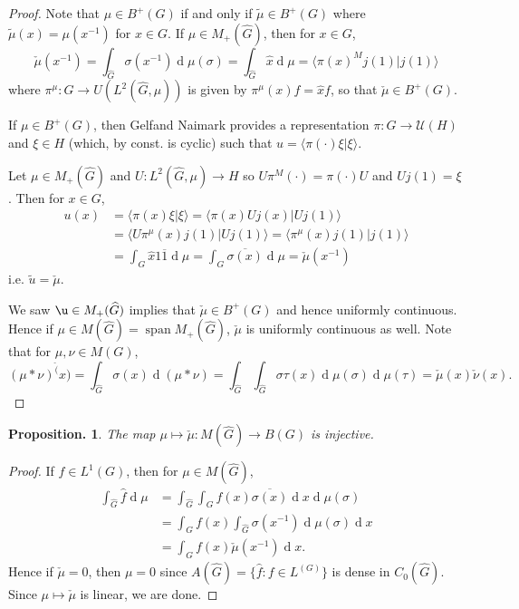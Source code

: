 \documentclass[11pt, a4paper]{memoir}
\theoremstyle{change}
\newtheorem{proposition}[theorem]{Proposition.}
\theoremstyle{plain}
\theoremstyle{nonumberplain}
\newtheorem{proof}{Proof}
\DeclareMathOperator{\spn}{span}
\renewcommand{\d}[1]{\ensuremath{\operatorname{d}\!{#1}}}
\numberwithin{equation}{section}
\begin{document}
\begin{proof}
    Note that $\mu\in B^+(G)$ if and only if $\tilde\mu\in B^+(G)$ where $\tilde\mu(x)=\mu(x^{-1})$ for $x\in G$.
    If $\mu\in M_+(\widehat{G})$, then for $x\in G$,
    \begin{equation*}
        \check\mu(x^{-1})=\int_{\widehat{G}}\sigma(x^{-1})\d{\mu(\sigma)}=\int_{\widehat{G}}\hat{x}\d{\mu}=\langle\pi(x)^Mj(1)|j(1)\rangle
    \end{equation*}
    where $\pi^\mu:G\to U(L^2(\widehat{G},\mu))$ is given by $\pi^\mu(x)f=\hat{x}f$, so that $\check{\mu}\in B^+(G)$.

    If $\mu\in B^+(G)$, then Gelfand Naimark provides a representation $\pi:G\to \mathcal{U}(H)$ and $\xi\in H$ (which, by const. is cyclic) such that $u=\langle\pi(\cdot)\xi|\xi\rangle$.

    Let $\mu\in M_+(\widehat{G})$ and $U:L^2(\widehat{G},\mu)\to H$ so $U\pi^M(\cdot)=\pi(\cdot)U$ and $Uj(1)=\xi$.
    Then for $x\in G$,
    \begin{align*}
        u(x) &= \langle\pi(x)\xi|\xi\rangle = \langle\pi(x) Uj(x) | Uj(1)\rangle\\
             &= \langle U\pi^\mu(x) j(1) |Uj(1)\rangle=\langle\pi^\mu(x) j(1) | j(1)\rangle\\
             &= \int_G\hat{x}1\overline{1}\d{\mu}=\int_G\overline{\sigma(x)}\d{\mu}=\check{\mu}(x^{-1})
    \end{align*}
    i.e. $\tilde{u}=\check{\mu}$.

    We saw $\u\in M_+(\widehat{G})$ implies that $\check{\mu}\in B^+(G)$ and hence uniformly continuous.
    Hence if $\mu\in M(\widehat{G})=\spn M_+(\widehat{G})$, $\check{\mu}$ is uniformly continuous as well.
    Note that for $\mu,\nu\in M(G)$,
    \begin{equation*}
        (\mu*\nu)^\check(x)=\int_{\widehat{G}}\sigma(x)\d{(\mu*\nu)}=\int_{\widehat{G}}\int_{\widehat{G}}\sigma\tau(x)\d{\mu(\sigma)}\d{\mu(\tau)}=\check{\mu}(x)\check{\nu}(x).
    \end{equation*}
\end{proof}
\begin{proposition}
    The map $\mu\mapsto\check{\mu}:M(\widehat{G})\to B(G)$ is injective.
\end{proposition}
\begin{proof}
    If $f\in L^1(G)$, then for $\mu\in M(\widehat{G})$,
    \begin{align*}
        \int_{\widehat{G}}\hat{f}\d{\mu} &= \int_{\widehat{G}}\int_G f(x)\overline{\sigma(x)}\d{x}\d{\mu(\sigma)}\\
                                         &= \int_Gf(x)\int_{\widehat{G}}\sigma(x^{-1})\d{\mu(\sigma)}\d{x}\\
                                         &= \int_G f(x)\check{\mu}(x^{-1})\d{x}.
    \end{align*}
    Hence if $\check{\mu}=0$, then $\mu=0$ since $A(\widehat{G})=\{\hat{f}:f\in L^(G)\}$ is dense in $C_0(\widehat{G})$.
    Since $\mu\mapsto\check{\mu}$ is linear, we are done.
\end{proof}
\end{document}
